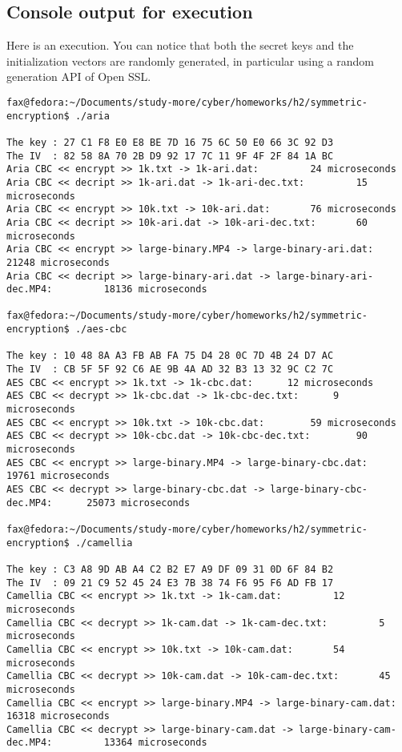 \documentclass{article}
\begin{document}
\subsection{Console output for execution}

Here is an execution.
You can notice that both the secret keys and the initialization vectors are randomly generated, in particular using a random generation API of Open SSL.

\begin{verbatim}
fax@fedora:~/Documents/study-more/cyber/homeworks/h2/symmetric-encryption$ ./aria 

The key : 27 C1 F8 E0 E8 BE 7D 16 75 6C 50 E0 66 3C 92 D3 
The IV  : 82 58 8A 70 2B D9 92 17 7C 11 9F 4F 2F 84 1A BC 
Aria CBC << encrypt >> 1k.txt -> 1k-ari.dat:		 24 microseconds
Aria CBC << decript >> 1k-ari.dat -> 1k-ari-dec.txt:		 15 microseconds
Aria CBC << encrypt >> 10k.txt -> 10k-ari.dat:		 76 microseconds
Aria CBC << decript >> 10k-ari.dat -> 10k-ari-dec.txt:		 60 microseconds
Aria CBC << encrypt >> large-binary.MP4 -> large-binary-ari.dat:		 21248 microseconds
Aria CBC << decript >> large-binary-ari.dat -> large-binary-ari-dec.MP4:		 18136 microseconds

fax@fedora:~/Documents/study-more/cyber/homeworks/h2/symmetric-encryption$ ./aes-cbc 

The key : 10 48 8A A3 FB AB FA 75 D4 28 0C 7D 4B 24 D7 AC 
The IV  : CB 5F 5F 92 C6 AE 9B 4A AD 32 B3 13 32 9C C2 7C 
AES CBC << encrypt >> 1k.txt -> 1k-cbc.dat:		 12 microseconds
AES CBC << decrypt >> 1k-cbc.dat -> 1k-cbc-dec.txt:		 9 microseconds
AES CBC << encrypt >> 10k.txt -> 10k-cbc.dat:		 59 microseconds
AES CBC << decrypt >> 10k-cbc.dat -> 10k-cbc-dec.txt:		 90 microseconds
AES CBC << encrypt >> large-binary.MP4 -> large-binary-cbc.dat:		 19761 microseconds
AES CBC << decrypt >> large-binary-cbc.dat -> large-binary-cbc-dec.MP4:		 25073 microseconds

fax@fedora:~/Documents/study-more/cyber/homeworks/h2/symmetric-encryption$ ./camellia 

The key : C3 A8 9D AB A4 C2 B2 E7 A9 DF 09 31 0D 6F 84 B2 
The IV  : 09 21 C9 52 45 24 E3 7B 38 74 F6 95 F6 AD FB 17 
Camellia CBC << encrypt >> 1k.txt -> 1k-cam.dat:		 12 microseconds
Camellia CBC << decrypt >> 1k-cam.dat -> 1k-cam-dec.txt:		 5 microseconds
Camellia CBC << encrypt >> 10k.txt -> 10k-cam.dat:		 54 microseconds
Camellia CBC << decrypt >> 10k-cam.dat -> 10k-cam-dec.txt:		 45 microseconds
Camellia CBC << encrypt >> large-binary.MP4 -> large-binary-cam.dat:		 16318 microseconds
Camellia CBC << decrypt >> large-binary-cam.dat -> large-binary-cam-dec.MP4:		 13364 microseconds


\end{verbatim}
\end{document}
